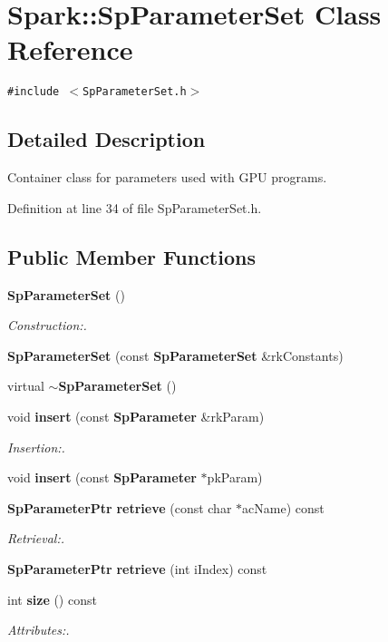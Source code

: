 \section{Spark::Sp\-Parameter\-Set Class Reference}
\label{classSpark_1_1SpParameterSet}
{\tt \#include $<$Sp\-Parameter\-Set.h$>$}



\subsection{Detailed Description}
Container class for parameters used with GPU programs. 

Definition at line 34 of file Sp\-Parameter\-Set.h.\subsection*{Public Member Functions}
\begin{CompactItemize}
\item 
{\bf Sp\-Parameter\-Set} ()
\begin{CompactList}\small\item\em Construction:. \item\end{CompactList}\item 
{\bf Sp\-Parameter\-Set} (const {\bf Sp\-Parameter\-Set} \&rk\-Constants)
\item 
virtual {\bf $\sim$Sp\-Parameter\-Set} ()
\item 
void {\bf insert} (const {\bf Sp\-Parameter} \&rk\-Param)
\begin{CompactList}\small\item\em Insertion:. \item\end{CompactList}\item 
void {\bf insert} (const {\bf Sp\-Parameter} $\ast$pk\-Param)
\item 
{\bf Sp\-Parameter\-Ptr} {\bf retrieve} (const char $\ast$ac\-Name) const
\begin{CompactList}\small\item\em Retrieval:. \item\end{CompactList}\item 
{\bf Sp\-Parameter\-Ptr} {\bf retrieve} (int i\-Index) const
\item 
int {\bf size} () const
\begin{CompactList}\small\item\em Attributes:. \item\end{CompactList}\end{CompactItemize}
